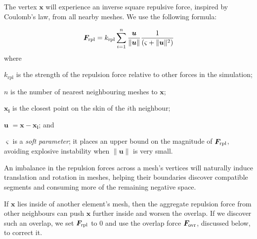 The vertex $\bm{x}$ will
experience an inverse square repulsive force, inspired by Coulomb's law,
from all nearby meshes.  We use the following formula:

\begin{equation}
\bm{F}_\mathrm{rpl} = k_\mathrm{rpl} \sum_{i = 1}^{n} \frac{\bm{u}}{\| \bm{u} \| }\frac{1}{(\varsigma  +\| \bm{u} \|^2 )}
\end{equation}
where 
\begin{packeddescriptions}
	\item[$k_\mathrm{rpl}$]        is the strength of the repulsion force relative to
						other forces in the simulation;
	\item[$n$]        is the number of nearest neighbouring meshes to $\bm{x}$; 
	\item[$\bm{x_{i}}$] is the closest point on the skin of the $i$th neighbour;
	\item[$\bm{u}$]  $= \bm{x} - \bm{x_{i}}$; and
	
	
	\item[$\varsigma$]   is a \textit{soft parameter}; it places an upper 
						bound on the magnitude of $\bm{F}_\mathrm{rpl}$, avoiding
						explosive instability when $\| \bm{u} \|$ is very small.
\end{packeddescriptions}

An imbalance in the repulsion forces across a mesh's vertices will
naturally induce translation and rotation in meshes, helping their
boundaries discover compatible segments and consuming more of the
remaining negative space.

If $\bm{x}$ lies inside of another element's mesh, then the aggregate repulsion
force from other neighbours can push $\bm{x}$ further inside and
worsen the overlap.  If we discover such an overlap, we set
$\bm{F}_\mathrm{rpl}$ to $0$ and use the overlap force $\bm{F}_\mathrm{ovr}$, discussed below, to
correct it.

\bigskip

